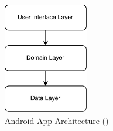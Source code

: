 \begin{figure}[htbp]
    \centering
    \includegraphics[width=0.33\textwidth, keepaspectratio]{content/05_design_and_dev_artefacts/ArchitectureBestPracticeAndroid.drawio.pdf}
    \caption[Android App Architecture]{Android App Architecture (\cite{Google.2023})}    
    \label{fig:androidAppArchitecture}
\end{figure}


